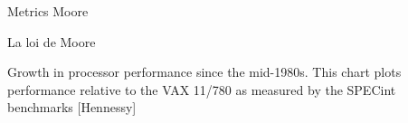 %
\begin{Frame}{Metrics Moore}
  \begin{block}{La loi de Moore}

    Growth in processor performance since the mid-1980s. This chart
    plots performance relative to the VAX 11/780 as measured by the
    SPECint benchmarks [Hennessy]
  \end{block}   
\end{Frame}


